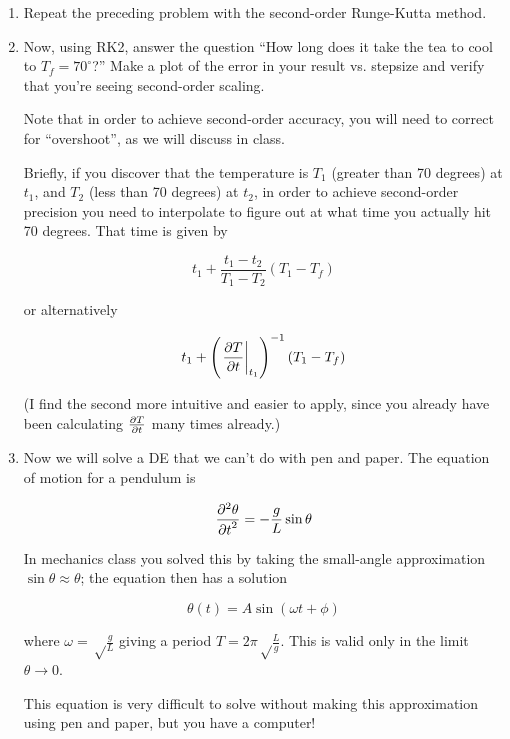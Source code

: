 \documentclass[12pt]{article}
\def\PAR#1#2{ {{\partial #1}\over{\partial #2}} }
\def\PARTWO#1#2{ {{\partial^2 #1}\over{\partial #2}^2} }
\begin{document}
\begin{enumerate}
\item{Repeat the preceding problem with the second-order Runge-Kutta method.}

\item{Now, using RK2, answer the question ``How long does it take the tea to cool to $T_f=70^\circ$?'' Make a plot of the error in your result vs. stepsize and verify that you're seeing second-order scaling. 

Note that in order to achieve second-order accuracy, you will need to correct for ``overshoot'', as we will discuss in class. 

Briefly, if you discover that the temperature is $T_1$ (greater than 70 degrees) at $t_1$, and $T_2$ (less than 70 degrees) at $t_2$, in order to achieve second-order precision you need to interpolate to figure out at what time you actually hit 70 degrees. That time is given by

\begin{equation}
t_1 + \frac{t_1-t_2}{T_1-T_2} (T_1-T_f)
\end{equation}

or alternatively

\begin{equation}
t_1 + \left(\left.\PAR{T}{t}\right|_{t_1}\right)^{-1} (T_1-T_f)
\end{equation}

(I find the second more intuitive and easier to apply, since you already have been calculating $\PAR{T}{t}$ many times already.)

}

\item{Now we will solve a DE that we can't do with pen and paper. The equation of motion for a pendulum is

\begin{equation}
\PARTWO{\theta}{t}=-\frac{g}{L} \sin \theta
\end{equation}

In mechanics class you solved this by taking the small-angle approximation $\sin \theta \approx \theta$; the equation then has a solution

\begin{equation}
\theta(t) = A \sin (\omega t + \phi)
\end{equation}

where $\omega=\sqrt\frac{g}{L}$ giving a period $T=2\pi\sqrt\frac{L}{g}$. This is valid only in the limit $\theta \rightarrow 0$.

This equation is very difficult to solve without making this approximation using pen and paper, but you have a computer! 

}
\end{enumerate}
\end{document}

